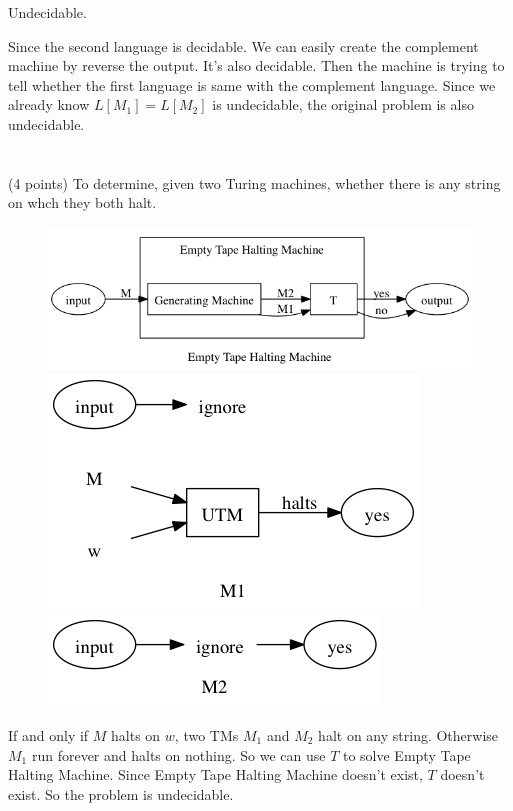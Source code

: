 \documentclass[paper=a4, fontsize=11pt]{scrartcl} %
\begin{document}
Undecidable.

Since the second language is decidable. We can easily create the
complement machine by reverse the output. It's also decidable.
Then the machine is trying to tell whether the first language is same
with the complement language. Since we already know $L[M_1]=L[M_2]$ is
undecidable, the original problem is also undecidable.


\section{}
\begin{fancyquotes}
  (4 points) To determine, given two Turing machines, whether there
  is any string on whch they both halt.
\end{fancyquotes}

\begin{figure}[H]
  \centering
  \includegraphics[width=\textwidth]{9-8.gv.png}
  \includegraphics[width=.5\textwidth]{9-8.gv.2.png}
  \includegraphics[width=.5\textwidth]{9-8.gv.3.png}
\end{figure}

If and only if $M$ halts on $w$, two TMs $M_1$ and $M_2$ halt on any
string. Otherwise $M_1$ run forever and halts on nothing. So we can
use $T$ to solve Empty Tape Halting Machine. Since Empty Tape Halting
Machine doesn't exist, $T$ doesn't exist. So the problem is undecidable.
\end{document}
